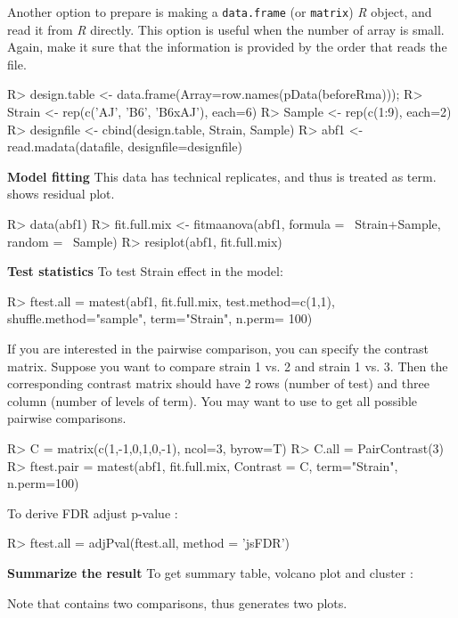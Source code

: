 Another option to prepare  is making a {\tt data.frame}
(or {\tt matrix}) {\em R} object, and read it from {\em R} directly. This option is useful when the number of array is small. Again, make it sure that the information is provided by the order that  reads the file.  
\begin{Sinput}
R> design.table <- data.frame(Array=row.names(pData(beforeRma)));
R> Strain <- rep(c('AJ', 'B6', 'B6xAJ'), each=6)
R> Sample <- rep(c(1:9), each=2)
R> designfile <- cbind(design.table, Strain, Sample)
R> abf1 <- read.madata(datafile, designfile=designfile)
\end{Sinput}
{\bf Model fitting} This data has technical replicates, and thus  is treated as  term.  shows residual plot. 
\begin{Sinput}
R> data(abf1)
R> fit.full.mix <- fitmaanova(abf1, formula = ~Strain+Sample, 
   random = ~Sample)
R> resiplot(abf1, fit.full.mix)
\end{Sinput}
{\bf Test statistics} To test Strain effect in the model:
\begin{Sinput}
R> ftest.all = matest(abf1, fit.full.mix, test.method=c(1,1),
    shuffle.method="sample", term="Strain", n.perm= 100)
\end{Sinput}
If you are interested in the pairwise comparison, you can specify the contrast
matrix. Suppose you want to compare strain 1 vs. 2 and
strain 1 vs. 3. Then the corresponding contrast matrix should have 2 rows
(number of test) and three column (number of levels of
term). You may want to use  to get all possible pairwise comparisons.  
\begin{Sinput}
R> C = matrix(c(1,-1,0,1,0,-1), ncol=3, byrow=T)
R> C.all = PairContrast(3)
R> ftest.pair = matest(abf1, fit.full.mix, Contrast = C, 
   term="Strain", n.perm=100)
\end{Sinput}
To derive FDR adjust p-value :
\begin{Sinput}
R> ftest.all = adjPval(ftest.all, method = 'jsFDR')
\end{Sinput}
{\bf Summarize the result} To get summary table, volcano plot and cluster :  
Note that  contains two comparisons, thus
 generates two plots. 
